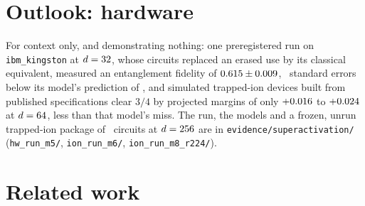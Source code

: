\documentclass[aps,pra,twocolumn,superscriptaddress,nofootinbib,longbibliography,floatfix]{revtex4-2}
\begin{document}
\section{Outlook: hardware}
\label{sec:hardware}

For context only, and demonstrating nothing: one preregistered run on \texttt{ibm\_kingston} at $d=32$, whose circuits replaced an erased use by its classical equivalent, measured an entanglement fidelity of $0.615\pm0.009$, \HwOverSigma\ standard errors below its model's prediction of \HwPred, and simulated trapped-ion devices built from published specifications clear $3/4$ by projected margins of only $+0.016$ to $+0.024$ at $d=64$, less than that model's miss. The run, the models and a frozen, unrun trapped-ion package of \IonUnits\ circuits at $d=256$ are in \texttt{evidence/\allowbreak superactivation/} (\texttt{hw\_run\_m5/}, \texttt{ion\_run\_m6/}, \texttt{ion\_run\_m8\_r224/}).

\section{Related work}
\label{sec:related}
\end{document}
